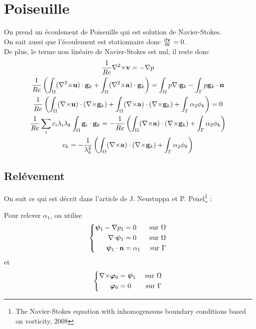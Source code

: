 \documentclass[a4paper,11pt]{article}
\begin{document}
\section{Poiseuille}
On prend un écoulement de Poiseuille qui est solution de Navier-Stokes.\\
On sait aussi que l'écoulement est stationnaire donc $\frac{\partial{\mathbf{v}}}{\partial t}=0$.\\
De plus, le terme non linéaire de Navier-Stokes est nul, il reste donc
\begin{gather}
  \frac{1}{Re}{\nabla^2\times}{\mathbf{v}}=-{\nabla} p\\
  \frac{1}{Re}\left( \int_\Omega({\nabla^2\times}{\mathbf{u}})\cdot{\mathbf{g}}_k  + \int_\Omega({\nabla^2\times}{\mathbf{a}})\cdot{\mathbf{g}}_k \right) = \int_\Omega p{\nabla\cdot}{\mathbf{g}}_k - \int_\Gamma p{\mathbf{g}}_k\cdot{\mathbf{n}}\\
  \frac{1}{Re}\left( \int_\Omega({\nabla\times}{\mathbf{u}})\cdot({\nabla\times}{\mathbf{g}}_k)  + \int_\Omega({\nabla\times}{\mathbf{a}})\cdot({\nabla\times}{\mathbf{g}}_k) + \int_\Gamma \alpha_2\phi_k \right) = 0\\
  \frac{1}{Re}\sum_i c_i\lambda_i\lambda_k\int_\Omega {\mathbf{g}}_i\cdot{\mathbf{g}}_k = -\frac{1}{Re}\left( \int_\Omega ({\nabla\times}{\mathbf{a}})\cdot({\nabla\times}{\mathbf{g}}_k) + \int_\Gamma \alpha_2\phi_k \right)\\
  c_k = -\frac{1}{\lambda_k^2}\left( \int_\Omega ({\nabla\times}{\mathbf{a}})\cdot({\nabla\times}{\mathbf{g}}_k) + \int_\Gamma \alpha_2\phi_k \right)
\end{gather}

\subsection{Relévement}
\label{relev}
On suit ce qui est décrit dans l'article de J. Neustuppa et P. Penel\footnote{The Navier-Stokes equation with inhomogeneous boundary conditions based on vorticity, 2008} :

Pour relever $\alpha_1$, on utilise
\begin{equation}\label{a1}
  \left\{
  \begin{aligned}
    \bm{\psi}_1 - {\nabla} p_1 &= 0 &\mbox{ sur }\Omega\\
    {\nabla\cdot}\bm{\psi}_1 &= 0 &\mbox{ sur }\Omega\\
    \bm{\psi}_1\cdot{\mathbf{n}} &= \alpha_1 &\mbox{ sur }\Gamma
  \end{aligned}
  \right.
\end{equation}
et
\begin{equation}
  \left\{
  \begin{aligned}
    {\nabla\times}\bm{\varphi}_0 &= \bm{\psi}_1 &\mbox{ sur }\Omega\\
    \bm{\varphi}_0 &= 0 &\mbox{ sur }\Gamma
  \end{aligned}
  \right.
\end{equation}
\end{document}
